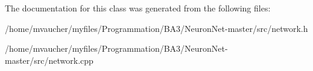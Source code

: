 The documentation for this class was generated from the following files\+:\begin{DoxyCompactItemize}
\item 
/home/mvaucher/myfiles/\+Programmation/\+B\+A3/\+Neuron\+Net-\/master/src/network.\+h\item 
/home/mvaucher/myfiles/\+Programmation/\+B\+A3/\+Neuron\+Net-\/master/src/network.\+cpp\end{DoxyCompactItemize}
